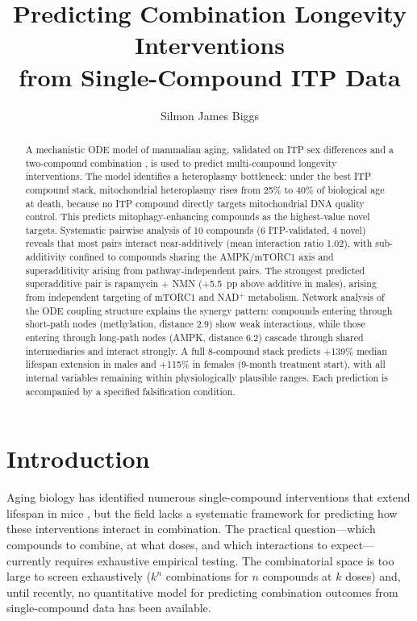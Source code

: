 \documentclass[11pt]{article}
\title{Predicting Combination Longevity Interventions\\from Single-Compound ITP Data}
\author{Silmon James Biggs}
\date{}
\begin{document}
\maketitle

\begin{abstract}
A mechanistic ODE model of mammalian aging, validated on ITP sex differences and a two-compound combination \citep{Biggs2025elm}, is used to predict multi-compound longevity interventions. The model identifies a heteroplasmy bottleneck: under the best ITP compound stack, mitochondrial heteroplasmy rises from 25\% to 40\% of biological age at death, because no ITP compound directly targets mitochondrial DNA quality control. This predicts mitophagy-enhancing compounds as the highest-value novel targets. Systematic pairwise analysis of 10 compounds (6 ITP-validated, 4 novel) reveals that most pairs interact near-additively (mean interaction ratio 1.02), with sub-additivity confined to compounds sharing the AMPK/mTORC1 axis and superadditivity arising from pathway-independent pairs. The strongest predicted superadditive pair is rapamycin + NMN (+5.5~pp above additive in males), arising from independent targeting of mTORC1 and NAD$^+$ metabolism. Network analysis of the ODE coupling structure explains the synergy pattern: compounds entering through short-path nodes (methylation, distance 2.9) show weak interactions, while those entering through long-path nodes (AMPK, distance 6.2) cascade through shared intermediaries and interact strongly. A full 8-compound stack predicts +139\% median lifespan extension in males and +115\% in females (9-month treatment start), with all internal variables remaining within physiologically plausible ranges. Each prediction is accompanied by a specified falsification condition.
\end{abstract}

\section{Introduction}

Aging biology has identified numerous single-compound interventions that extend lifespan in mice \citep{Miller2007,Strong2008,Harrison2009}, but the field lacks a systematic framework for predicting how these interventions interact in combination. The practical question---which compounds to combine, at what doses, and which interactions to expect---currently requires exhaustive empirical testing. The combinatorial space is too large to screen exhaustively ($k^n$ combinations for $n$ compounds at $k$ doses) and, until recently, no quantitative model for predicting combination outcomes from single-compound data has been available.
\end{document}
